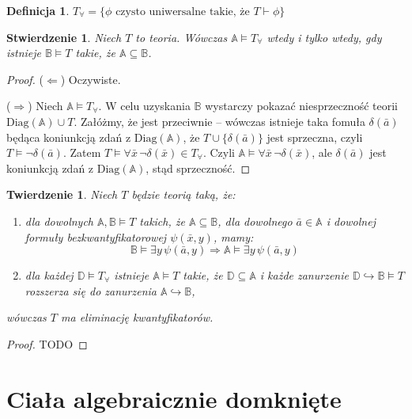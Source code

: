 \documentclass{article}
\newcommand{\A}{\mathbb{A}}
\newcommand{\B}{\mathbb{B}}
\newcommand{\D}{\mathbb{D}}
\theoremstyle{plain}
\newtheorem{tw}[thm]{Twierdzenie}
\newtheorem{stw}[thm]{Stwierdzenie}
\theoremstyle{definition}
\newtheorem{df}[thm]{Definicja}
\theoremstyle{remark}
\newcommand{\wtw}{wtedy i tylko wtedy, gdy }
\newcommand{\Diag}{\text{Diag}}
\begin{document}

\begin{df}
	$T_{\forall} = \{\phi \text{ czysto uniwersalne takie, że } T \vdash
	\phi\}$
\end{df}

\begin{stw}
	Niech $T$ to teoria. Wówczas $\A \models T_{\forall}$ \wtw istnieje $\B
	\models T$ takie, że $\A \subseteq \B$.
\end{stw}
\begin{proof}
	($\Leftarrow$) Oczywiste.

	($\Rightarrow$) Niech $\A \models T_{\forall}$. W celu uzyskania
	$\B$ wystarczy pokazać niesprzeczność teorii $\Diag(\A) \cup T$.
	Załóżmy, że jest przeciwnie -- wówczas istnieje taka fomuła
	$\delta(\bar{a})$ będąca koniunkcją zdań z $\Diag(\A)$, że $T \cup
	\{\delta(\bar{a})\}$ jest sprzeczna, czyli $T \models \neg
	\delta(\bar{a})$. Zatem $T \models \forall \bar{x} \, \neg
	\delta(\bar{x}) \in T_{\forall}$. Czyli $\A \models \forall \bar{x} \,
	\neg \delta(\bar{x})$, ale $\delta(\bar{a})$ jest koniunkcją zdań z
	$\Diag(\A)$, stąd sprzeczność.
\end{proof}

\begin{tw}
	\label{tw:qe}
	Niech $T$ będzie teorią taką, że:
	\begin{enumerate}
		\item dla dowolnych $\A, \B \models T$ takich, że $\A \subseteq
			\B$, dla dowolnego $\bar{a} \in \A$ i dowolnej formuły
			bezkwantyfikatorowej $\psi(\bar{x}, y)$, mamy:
			\[
				\B \models \exists y \, \psi(\bar{a}, y)
				\Rightarrow \A \models \exists y \, \psi(\bar{a}, y)
			\]
		\item dla każdej $\D \models T_{\forall}$ istnieje $\A \models
			T$ takie, że $\D \subseteq \A$ i każde zanurzenie $\D
			\hookrightarrow \B \models T$ rozszerza się do
			zanurzenia $\A \hookrightarrow \B$,
	\end{enumerate}
	wówczas $T$ ma eliminację kwantyfikatorów.
\end{tw}
\begin{proof}
	\color{red} TODO
\end{proof}


\section{Ciała algebraicznie domknięte}
\end{document}
